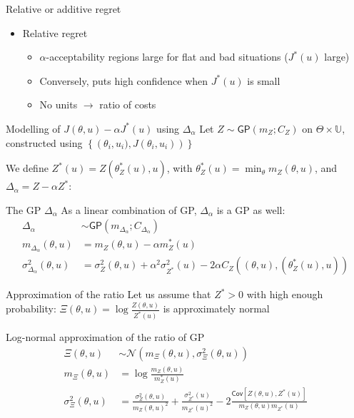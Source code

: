 \documentclass[10pt,aspectratio=169,usepdftitle=false]{beamer}
\newcommand\manupath{/home/victor/acadwriting/Manuscrit/Text/}
\newcommand{\Uspace}{\mathbb{U}}
\newcommand{\Kspace}{\Theta}
\newcommand{\GP}{\mathsf{GP}}
\newcommand{\Cov}{\textsf{Cov}}
\newcommand{\kk}{\theta}
\newcommand{\uu}{u}
\begin{document}
\begin{frame}{Relative or additive regret}
 
  \renewcommand\rmfamily{\sffamily}
  \begin{center}
    \resizebox{.5\textwidth}{!}{}
  \end{center}
  \begin{itemize}
  \item Relative regret
    \begin{itemize}
    \item $\alpha$-acceptability regions large for flat and bad
      situations ($J^*(\uu)$ large)
    \item Conversely, puts high confidence when $J^*(\uu)$ is small
    \item No units $\rightarrow$ ratio of costs
    \end{itemize}
  \end{itemize}
\end{frame}

\begin{frame}{Modelling of $J(\kk, \uu) - \alpha J^*(\uu)$ using $\Delta_{\alpha}$}
  Let
  $Z \sim \GP\left(m_Z; C_Z\right) \text{ on } \Kspace \times \Uspace$, constructed using $\left\{\left(\kk_i,\uu_i), J(\kk_i, \uu_i)\right)\right\}$

  We define $Z^*(\uu)=Z(\kk^*_Z(\uu), \uu)$, with $\kk^*_Z(\uu) = \min_{\kk} m_Z(\kk, \uu)$,
  and $\Delta_{\alpha} = Z - \alpha Z^*$:
  \begin{block}{The GP $\Delta_\alpha$}
    As a linear combination of GP, $\Delta_{\alpha}$ is a GP as well:
  \begin{align}
    \Delta_{\alpha} &\sim \GP\left(m_{\Delta_{\alpha}};C_{\Delta_\alpha}\right) \\
    m_{\Delta_\alpha}(\kk,\uu)   &= m_Z(\kk, \uu) - \alpha m_Z^*(\uu) \\
    \sigma^2_{\Delta_\alpha}(\kk, \uu) &= \sigma^2_{Z}(\kk, \uu) +  {\alpha^2\sigma^2_{Z^*}(\uu)}- 2\alpha C_Z\left((\kk, \uu), ({\kk}_Z^ *(\uu), \uu)\right)
  \end{align}
\end{block}
\end{frame}


\begin{frame}{Approximation of the ratio}
  Let us assume that $Z^*>0$ with high enough probability:
  $\Xi(\kk, \uu) = \log \frac{Z(\kk,\uu)}{Z^*(\uu)}$ is approximately normal
  \begin{block}{Log-normal approximation of the ratio of GP}
    \begin{align}
      \Xi(\kk, \uu) &\sim \mathcal{N}\left(m_\Xi(\kk,\uu), \sigma^2_\Xi(\kk, \uu) \right) \\
      m_\Xi(\kk, \uu) &= \log \frac{m_Z(\kk, \uu)}{m_Z^*(\uu)} \\
      \sigma^2_\Xi(\kk, \uu) &= \frac{\sigma^2_{Z}(\kk, \uu)}{m_{Z}(\kk,\uu)^2} + {\frac{\sigma^2_{Z^*}(\uu)}{m_{Z^*}(\uu)^2}} - 2 \frac{\Cov[Z(\kk, \uu), Z^*(\uu)]}{m_Z(\kk, \uu)m_{Z^*}(\uu)} 
    \end{align}
  \end{block}
\end{frame}
\end{document}
